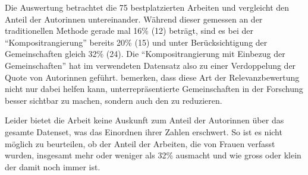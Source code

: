 Die Auswertung betrachtet die 75 bestplatzierten Arbeiten und vergleicht den Anteil der Autorinnen untereinander. Während dieser gemessen an der traditionellen Methode
gerade mal 16\% (12) beträgt, sind es bei der \enquote{Kompositrangierung} bereits 20\% (15) und unter Berücksichtigung der Gemeinschaften gleich 32\% (24).
Die \enquote{Kompositrangierung mit Einbezug der Gemeinschaften} hat im verwendeten Datensatz also zu einer Verdoppelung der Quote von Autorinnen geführt. 
\citeauthor{citation-network} bemerken, dass diese Art der Relevanzbewertung nicht nur dabei helfen kann, unterrepräsentierte Gemeinschaften in der Forschung besser 
sichtbar zu machen, sondern auch den  zu reduzieren.

Leider bietet die Arbeit keine Auskunft zum Anteil der Autorinnen über das gesamte Datenset, was das Einordnen ihrer Zahlen erschwert. So ist es nicht möglich zu beurteilen,
ob der Anteil der Arbeiten, die von Frauen verfasst wurden, insgesamt mehr oder weniger als 32\% ausmacht und wie gross oder klein der  damit noch immer ist.